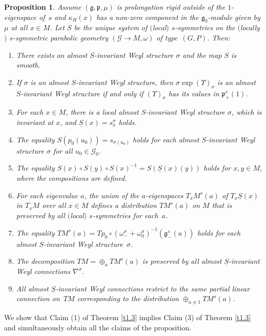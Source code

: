 \documentclass[pdftex]{sigma}
\newcommand{\om}{\omega}
\newcommand{\si}{\sigma}
\newcommand{\un}{\underline}
\newcommand{\ba}{\mathcal{G}}
\newcommand{\fg}{\mathfrak g}
\newcommand{\fp}{\mathfrak p}
\newcommand{\U}{\Upsilon}
\numberwithin{equation}{section}
\newtheorem{Proposition}[Theorem]{Proposition}
 { \theoremstyle{definition}
\newtheorem{Definition}[Theorem]{Definition}
\newtheorem{Example}[Theorem]{Example}
\newtheorem{Remark}[Theorem]{Remark} }
\begin{document}
\begin{Proposition} \label{almost-ws}
Assume $(\fg,\fp,\mu)$ is prolongation rigid outside of the $1$-eigenspace of~$s$ and $\kappa_H(x)$ has a non-zero component in the $\fg_0$-module given by $\mu$ at all $x\in M$. Let $S$ be the unique system of $($local$)$ $s$-symmetries on the $($locally$)$ $s$-symmetric parabolic geometry $(\ba\to M,\om)$ of type~$(G,P)$. Then:
\begin{enumerate}\itemsep=0pt
\item[$1.$] There exists an almost $S$-invariant Weyl structure $\si$ and the map $S$ is smooth.
\item[$2.$] If $\si$ is an almost $S$-invariant Weyl structure, then $\si\exp(\U)_\si$ is an almost $S$-invariant Weyl structure if and only if $(\U)_\si$ has its values in $\fp^s_+(1)$.
\item[$3.$] For each $x\in M$, there is a local almost $S$-invariant Weyl structure $\si$, which is invariant at $x$, and $\un S(x)=s_x^{\si}$ holds.
\item[$4.$] The equality $S(p_0(u_0))=s_{\si(u_0)}$ holds for each almost $S$-invariant Weyl structure $\si$ for all $u_0\in \ba_0$.
\item[$5.$] The equality $S(x)\circ S(y)\circ S(x)^{-1}=S(\un S(x)(y))$ holds for $x,y\in M$, where the compositions are defined.
\item[$6.$] For each eigenvalue $a$, the union of the $a$-eigenspaces $T_xM^s(a)$ of $T_x\un S(x)$ in $T_xM$ over all $x\in M$ defines a distribution $TM^s(a)$ on $M$ that is preserved by all $($local$)$ $s$-symmetries for each~$a$.
\item[$7.$] The equality $TM^s(a)=Tp_0\circ (\om^\si_-+\om^\si_0)^{-1}(\fg_-^s(a))$ holds for each almost $S$-invariant Weyl structure~$\si$.
\item[$8.$] The decomposition $TM=\oplus_a TM^s(a)$ is preserved by all almost $\un S$-inva\-riant Weyl connections $\nabla^\si$.
\item[$9.$] All almost $\un S$-invariant Weyl connections restrict to the same partial linear connection on~$TM$ corresponding to the distribution $\oplus_{a\neq 1} TM^s(a)$.
\end{enumerate}
\end{Proposition}
We show that Claim (1) of Theorem \ref{t1.3} implies Claim (3) of Theorem \ref{t1.3} and simultaneously obtain all the claims of the proposition.
\end{document}
